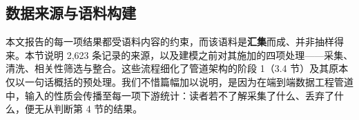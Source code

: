 \documentclass[11pt]{article}
\begin{document}
\subsection{{\cjkfont 数\allowbreak 据\allowbreak 来\allowbreak 源\allowbreak 与\allowbreak 语\allowbreak 料\allowbreak 构\allowbreak 建}}
{\cjkfont 本\allowbreak 文\allowbreak 报\allowbreak 告\allowbreak 的\allowbreak 每\allowbreak 一\allowbreak 项\allowbreak 结\allowbreak 果\allowbreak 都\allowbreak 受\allowbreak 语\allowbreak 料\allowbreak 内\allowbreak 容\allowbreak 的\allowbreak 约\allowbreak 束\allowbreak ，\allowbreak 而\allowbreak 该\allowbreak 语\allowbreak 料\allowbreak 是}\textbf{{\cjkfont 汇\allowbreak 集}}{\cjkfont 而\allowbreak 成\allowbreak 、\allowbreak 并\allowbreak 非\allowbreak 抽\allowbreak 样\allowbreak 得\allowbreak 来\allowbreak 。\allowbreak 本\allowbreak 节\allowbreak 说\allowbreak 明} 2,623 {\cjkfont 条\allowbreak 记\allowbreak 录\allowbreak 的\allowbreak 来\allowbreak 源\allowbreak ，\allowbreak 以\allowbreak 及\allowbreak 建\allowbreak 模\allowbreak 之\allowbreak 前\allowbreak 对\allowbreak 其\allowbreak 施\allowbreak 加\allowbreak 的\allowbreak 四\allowbreak 项\allowbreak 处\allowbreak 理}------{\cjkfont 采\allowbreak 集\allowbreak 、\allowbreak 清\allowbreak 洗\allowbreak 、\allowbreak 相\allowbreak 关\allowbreak 性\allowbreak 筛\allowbreak 选\allowbreak 与\allowbreak 整\allowbreak 合\allowbreak 。\allowbreak 这\allowbreak 些\allowbreak 流\allowbreak 程\allowbreak 细\allowbreak 化\allowbreak 了\allowbreak 管\allowbreak 道\allowbreak 架\allowbreak 构\allowbreak 的\allowbreak 阶\allowbreak 段} 1{\cjkfont （}3.4 {\cjkfont 节\allowbreak ）\allowbreak 及\allowbreak 其\allowbreak 原\allowbreak 本\allowbreak 仅\allowbreak 以\allowbreak 一\allowbreak 句\allowbreak 话\allowbreak 概\allowbreak 括\allowbreak 的\allowbreak 预\allowbreak 处\allowbreak 理\allowbreak 。\allowbreak 我\allowbreak 们\allowbreak 不\allowbreak 惜\allowbreak 篇\allowbreak 幅\allowbreak 加\allowbreak 以\allowbreak 说\allowbreak 明\allowbreak ，\allowbreak 是\allowbreak 因\allowbreak 为\allowbreak 在\allowbreak 端\allowbreak 到\allowbreak 端\allowbreak 数\allowbreak 据\allowbreak 工\allowbreak 程\allowbreak 管\allowbreak 道\allowbreak 中\allowbreak ，\allowbreak 输\allowbreak 入\allowbreak 的\allowbreak 性\allowbreak 质\allowbreak 会\allowbreak 传\allowbreak 播\allowbreak 至\allowbreak 每\allowbreak 一\allowbreak 项\allowbreak 下\allowbreak 游\allowbreak 统\allowbreak 计\allowbreak ：\allowbreak 读\allowbreak 者\allowbreak 若\allowbreak 不\allowbreak 了\allowbreak 解\allowbreak 采\allowbreak 集\allowbreak 了\allowbreak 什\allowbreak 么\allowbreak 、\allowbreak 丢\allowbreak 弃\allowbreak 了\allowbreak 什\allowbreak 么\allowbreak ，\allowbreak 便\allowbreak 无\allowbreak 从\allowbreak 判\allowbreak 断\allowbreak 第} 4 {\cjkfont 节\allowbreak 的\allowbreak 结\allowbreak 果\allowbreak 。}
\end{document}
